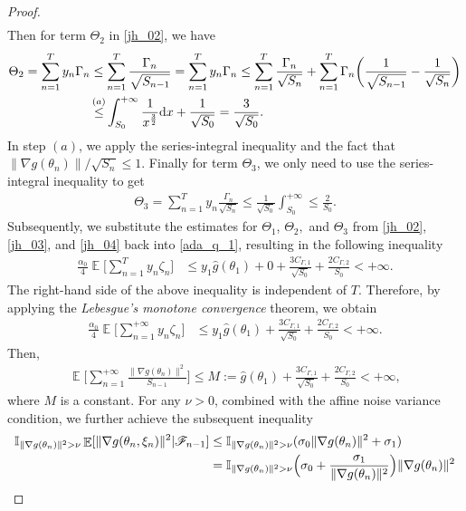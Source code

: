 \documentclass[standalone]{article}
\newcommand{\I}{\mathbb{I}}
\DeclareMathOperator{\Expect}{\mathbb{E}}
\begin{document}
\begin{proof}
\begin{align}
\end{align}
Then for term $\Theta_{2}$ in \cref{jh_02}, we have
\begin{align}\label{jh_03}
\Theta_{2}=\sum_{n=1}^{T}y_{n}\Gamma_{n}&\le \sum_{n=1}^{T}\frac{\Gamma_{n}}{\sqrt{S_{n-1}}}=\sum_{n=1}^{T}y_{n}\Gamma_{n}\le \sum_{n=1}^{T}\frac{\Gamma_{n}}{\sqrt{S_{n}}}+\sum_{n=1}^{T}\Gamma_{n}\bigg(\frac{1}{\sqrt{S_{n-1}}}-\frac{1}{\sqrt{S_{n}}}\bigg)\notag\\&\mathop{\le}^{(a)} \int_{S_{0}}^{+\infty}\frac{1}{x^{\frac{3}{2}}}\text{d}x+\frac{1}{\sqrt{S_{0}}}=\frac{3}{\sqrt{S_{0}}}.
\end{align}
In step $(a)$, we apply the series-integral inequality and the fact that \(\|\nabla g(\theta_{n})\|/\sqrt{S_{n}}\le 1.\)
Finally for term \(\Theta_{3}\), we only need to use the series-integral inequality to get
\begin{align}\label{jh_04}
\Theta_{3}=\sum_{n=1}^{T}y_{n}\frac{\Gamma_{n}}{\sqrt{S_{n}}}\le \frac{1}{\sqrt{S_{0}}}\int_{S_{0}}^{+\infty}\le \frac{2}{S_{0}}.
\end{align}
Subsequently, we substitute the estimates for $\Theta_{1}$, $\Theta_{2},$ and $\Theta_{3}$ from \cref{jh_02}, \cref{jh_03}, and \cref{jh_04} back into \cref{ada_q_1}, resulting in the following inequality
\begin{align*}
\frac{\alpha_{0}}{4}\Expect\Bigg[\sum_{n=1}^{T}y_{n}\zeta_{n}\Bigg]&{\leq} y_{1}\hat{g}(\theta_{1})+0+\frac{3C_{\Gamma,1}}{\sqrt{S_{0}}}+\frac{2C_{\Gamma,2}}{S_{0}}<+\infty.
\end{align*}
The right-hand side of the above inequality is independent of \(T\). Therefore, by applying the \emph{ Lebesgue's monotone convergence} theorem, we obtain
\begin{align*}
\frac{\alpha_{0}}{4}\Expect\Bigg[\sum_{n=1}^{+\infty}y_{n}\zeta_{n}\Bigg]&{\leq} y_{1}\hat{g}(\theta_{1})+\frac{3C_{\Gamma,1}}{\sqrt{S_{0}}}+\frac{2C_{\Gamma,2}}{S_{0}}<+\infty.
\end{align*}
Then,
\begin{align*}
\Expect\Bigg[\sum_{n=1}^{+\infty}\frac{\|\nabla g(\theta_{n})\|^{2}}{S_{n-1}}\Bigg]\le M:=\hat{g}(\theta_{1})+\frac{3C_{\Gamma,1}}{\sqrt{S_{0}}}+\frac{2C_{\Gamma,2}}{S_{0}}<+\infty,
\end{align*}
where $M$ is a constant. For any $\nu > 0$,
combined with the affine noise variance condition, we further achieve the subsequent inequality
\begin{align}
    \I_{\|\nabla g(\theta_{n})\|^{2}> \nu}\Expect[\|\nabla g(\theta_{n},\xi_{n})\|^{2}|\mathscr{F}_{n-1}]&\le \I_{\|\nabla g(\theta_{n})\|^{2}>\nu}( {\sigma_{0}}\|\nabla g(\theta_{n})\|^{2}+{\sigma_{1}})\notag\\&= \I_{\|\nabla g(\theta_{n})\|^{2}>\nu}\Big({\sigma_{0}}+\frac{{\sigma_{1}}}{\|\nabla g(\theta_{n})\|^{2}}\Big)\|\nabla g(\theta_{n})\|^{2} \notag \\

\end{align}
\end{proof}
\end{document}
